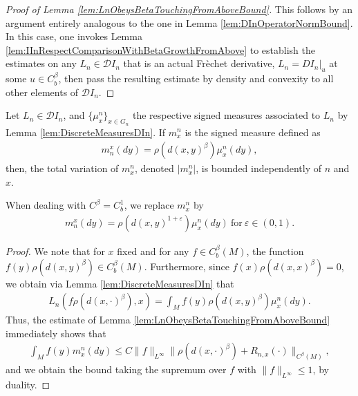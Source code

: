 \documentclass[11pt,reqno]{amsart}
\numberwithin{equation}{section}
\theoremstyle{plain}
\def\D{\mathcal D}
\def\ep{\varepsilon}
\newcommand{\abs}[1]{\left| #1 \right|}
\newcommand{\norm}[1]{\lVert#1\rVert}
\begin{document}
\begin{proof}[Proof of Lemma \ref{lem:LnObeysBetaTouchingFromAboveBound}]
	This follows by an argument entirely analogous to the one in Lemma \ref{lem:DInOperatorNormBound}. In this case, one invokes Lemma \ref{lem:IInRespectComparisonWithBetaGrowthFromAbove} to establish the estimates on any $L_n\in\D I_n$ that is an actual Fr\`echet derivative, $L_n=DI_n|_u$ at some $u\in C^\beta_b$, then pass the resulting estimate by density and convexity to all other elements of $\D I_n$.
\end{proof}

\begin{lem}\label{lem:MuNTotalVariation}
	Let $L_n\in\D I_n$, and  $\{\mu_x^n\}_{x\in G_n}$ the respective signed measures associated to $L_n$ by Lemma \ref{lem:DiscreteMeasuresDIn}.  If $m_x^n$ is the signed measure defined as
	\begin{align*}
		m_n^x(dy)=\rho(d(x,y)^{\beta})\mu_x^n(dy),
	\end{align*} 
	then, the total variation of $m_x^n$, denoted $\displaystyle\abs{m_x^n}$, is bounded independently of $n$ and $x$.
	
	When dealing with $C^\beta = C^1_b$, we replace $m^n_x$ by 
	\begin{align*}
		m_n^x(dy)=\rho(d(x,y)^{1+\ep})\mu_x^n(dy)\ \text{for}\ \ep\in(0,1).
	\end{align*}
\end{lem}

\begin{proof}
We note that for $x$ fixed and for any $f\in C^\beta_b(M)$, the function $f(y)\rho(d(x,y)^\beta)\in C^\beta_b(M)$.  Furthermore, since $f(x)\rho(d(x,x)^\beta)=0$, we obtain via Lemma \ref{lem:DiscreteMeasuresDIn} that
\begin{align*}
	L_n(f\rho(d(x,\cdot)^\beta),x) = \int_{M} f(y)\rho(d(x,y)^\beta)\mu_x^n(dy).
\end{align*}
Thus, the estimate of Lemma \ref{lem:LnObeysBetaTouchingFromAboveBound} immediately shows that
\begin{align*}
	\int_{M} f(y) m_x^n(dy)\leq C\norm{f}_{L^\infty}\norm{\rho(d(x,\cdot)^\beta)+R_{n,x}(\cdot)}_{C^\beta(M)},
\end{align*}	
and we obtain the bound taking the supremum over $f$ with $\|f\|_{L^\infty}\leq 1$, by duality.

\end{proof}
\end{document}
